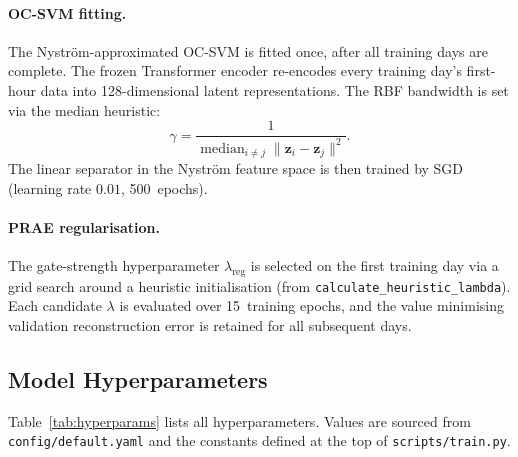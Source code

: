 \documentclass[11pt]{report}
\begin{document}
\paragraph{OC-SVM fitting.}
The Nystr\"om-approximated OC-SVM is fitted once, after all training days are complete. The frozen Transformer encoder re-encodes every training day's first-hour data into 128-dimensional latent representations. The RBF bandwidth is set via the median heuristic:
\[
  \gamma = \frac{1}{\operatorname{median}_{i \neq j} \| \mathbf{z}_i - \mathbf{z}_j \|^2}.
\]
The linear separator in the Nystr\"om feature space is then trained by SGD (learning rate $0.01$, 500~epochs).

\paragraph{PRAE regularisation.}
The gate-strength hyperparameter $\lambda_{\text{reg}}$ is selected on the first training day via a grid search around a heuristic initialisation (from \texttt{calculate\_heuristic\_lambda}). Each candidate $\lambda$ is evaluated over 15~training epochs, and the value minimising validation reconstruction error is retained for all subsequent days.

\subsection{Model Hyperparameters}\label{sec:data:hyperparams}

Table~\ref{tab:hyperparams} lists all hyperparameters. Values are sourced from \texttt{config/default.yaml} and the constants defined at the top of \texttt{scripts/train.py}.
\end{document}
